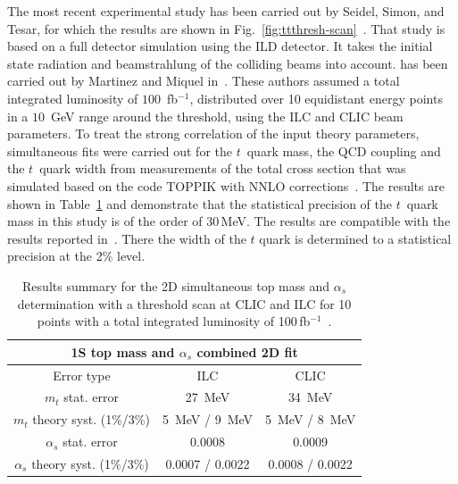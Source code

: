 The most recent experimental study has been carried out by Seidel, Simon, and Tesar, for which the 
results are shown in Fig.~\ref{fig:ttthresh-scan}~\cite{Seidel:2013sqa}. That study is based on a full detector simulation 
using the ILD detector. It takes the initial state radiation and beamstrahlung of the colliding beams into 
account. has been carried out by Martinez and Miquel in~\cite{Martinez:2002st}.
These authors assumed a total integrated luminosity of $100$~fb$^{-1}$, distributed over 10 equidistant energy points 
in a $10$~GeV range around the threshold, using the ILC and CLIC beam parameters. To treat the 
strong correlation of the input theory parameters, simultaneous fits 
were carried out for the $t$~quark mass, the QCD coupling and the $t$~quark width from 
measurements of the total cross section that was simulated based on the code TOPPIK with NNLO corrections~\cite{Hoang:1999zc}. 
The results are shown in Table~\ref{tab:ThresholdResults} and demonstrate that the statistical precision of the $t$~quark mass in this study is of the order of 30\,MeV.
The results are compatible with the results reported in~\cite{Horiguchi:2013wra}. There the width of the $t$ quark is determined to a statistical precision at the 2\% level.   

\begin{table}
\centering
\begin{tabular}{|ccc|}
\hline
\multicolumn{3}{|c|}{1S top mass and $\alpha_s$ combined 2D fit}\\
\hline
Error type & ILC & CLIC \\
\hline
 $m_t$ stat. error &  27~MeV & 34~MeV\\
 $m_t$ theory syst. (1\%/3\%) &  5~MeV / 9~MeV & 5~MeV / 8~MeV\\
 $\alpha_s$ stat. error & 0.0008 & 0.0009\\
 $\alpha_s$ theory syst. (1\%/3\%) & 0.0007 / 0.0022 & 0.0008 / 0.0022 \\
\hline
\end{tabular}

\caption{Results summary for the 2D simultaneous top mass and $\alpha_s$ determination with a threshold scan at CLIC and ILC for 10 points with a total integrated luminosity of 100\,fb$^{-1}$~\cite{Seidel:2013sqa}. \label{tab:ThresholdResults}}
\end{table}



